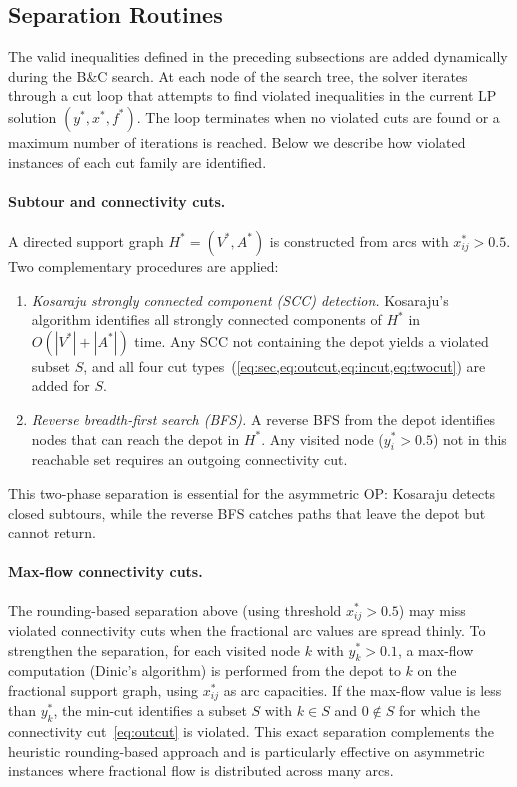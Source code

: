 \documentclass[11pt,a4paper]{article}
\begin{document}
\subsection{Separation Routines}
\label{sec:separation}

The valid inequalities defined in the preceding subsections are added dynamically during the B\&C search.
At each node of the search tree, the solver iterates through a cut loop that attempts to find violated inequalities in the current LP solution $(y^*, x^*, f^*)$.
The loop terminates when no violated cuts are found or a maximum number of iterations is reached.
Below we describe how violated instances of each cut family are identified.

\paragraph{Subtour and connectivity cuts.}
A directed support graph $H^* = (V^*, A^*)$ is constructed from arcs with $x_{ij}^* > 0.5$.
Two complementary procedures are applied:
\begin{enumerate}[nosep]
  \item \emph{Kosaraju strongly connected component (SCC) detection.}
        Kosaraju's algorithm identifies all strongly connected components of $H^*$ in $O(|V^*| + |A^*|)$ time.
        Any SCC not containing the depot yields a violated subset $S$, and all four cut types~(\cref{eq:sec,eq:outcut,eq:incut,eq:twocut}) are added for $S$.
  \item \emph{Reverse breadth-first search (BFS).}
        A reverse BFS from the depot identifies nodes that can reach the depot in $H^*$.
        Any visited node ($y_i^* > 0.5$) not in this reachable set requires an outgoing connectivity cut.
\end{enumerate}
This two-phase separation is essential for the asymmetric OP\@: Kosaraju detects closed subtours, while the reverse BFS catches paths that leave the depot but cannot return.

\paragraph{Max-flow connectivity cuts.}
The rounding-based separation above (using threshold $x_{ij}^* > 0.5$) may miss violated connectivity cuts when the fractional arc values are spread thinly.
To strengthen the separation, for each visited node $k$ with $y_k^* > 0.1$, a max-flow computation (Dinic's algorithm) is performed from the depot to $k$ on the fractional support graph, using $x_{ij}^*$ as arc capacities.
If the max-flow value is less than $y_k^*$, the min-cut identifies a subset $S$ with $k \in S$ and $0 \notin S$ for which the connectivity cut~\eqref{eq:outcut} is violated.
This exact separation complements the heuristic rounding-based approach and is particularly effective on asymmetric instances where fractional flow is distributed across many arcs.
\end{document}
